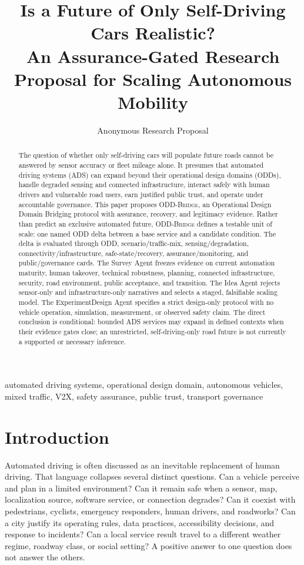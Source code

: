 \documentclass[conference]{../../../../Conference-LaTeX-template_10-17-19/IEEEtran}
\title{Is a Future of Only Self-Driving Cars Realistic?\\
\large An Assurance-Gated Research Proposal for Scaling Autonomous Mobility}
\author{Anonymous Research Proposal}
\newcommand{\oddbridge}{\textsc{ODD-Bridge}}
\begin{document}
\maketitle

\begin{abstract}
The question of whether only self-driving cars will populate future roads cannot be answered by sensor accuracy or fleet mileage alone. It presumes that automated driving systems (ADS) can expand beyond their operational design domains (ODDs), handle degraded sensing and connected infrastructure, interact safely with human drivers and vulnerable road users, earn justified public trust, and operate under accountable governance. This paper proposes \oddbridge{}, an Operational Design Domain Bridging protocol with assurance, recovery, and legitimacy evidence. Rather than predict an exclusive automated future, \oddbridge{} defines a testable unit of scale: one named ODD delta between a base service and a candidate condition. The delta is evaluated through ODD, scenario/traffic-mix, sensing/degradation, connectivity/infrastructure, safe-state/recovery, assurance/monitoring, and public/governance cards. The Survey Agent freezes evidence on current automation maturity, human takeover, technical robustness, planning, connected infrastructure, security, road environment, public acceptance, and transition. The Idea Agent rejects sensor-only and infrastructure-only narratives and selects a staged, falsifiable scaling model. The ExperimentDesign Agent specifies a strict design-only protocol with no vehicle operation, simulation, measurement, or observed safety claim. The direct conclusion is conditional: bounded ADS services may expand in defined contexts when their evidence gates close; an unrestricted, self-driving-only road future is not currently a supported or necessary inference.
\end{abstract}

\begin{IEEEkeywords}
automated driving systems, operational design domain, autonomous vehicles, mixed traffic, V2X, safety assurance, public trust, transport governance
\end{IEEEkeywords}

\section{Introduction}
Automated driving is often discussed as an inevitable replacement of human driving. That language collapses several distinct questions. Can a vehicle perceive and plan in a limited environment? Can it remain safe when a sensor, map, localization source, software service, or connection degrades? Can it coexist with pedestrians, cyclists, emergency responders, human drivers, and roadworks? Can a city justify its operating rules, data practices, accessibility decisions, and response to incidents? Can a local service result travel to a different weather regime, roadway class, or social setting? A positive answer to one question does not answer the others.
\end{document}
